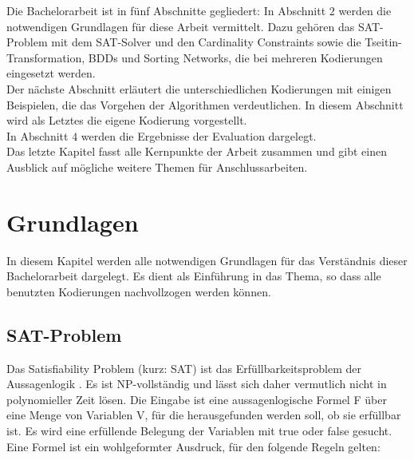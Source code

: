\documentclass[a4,abstract=on]{scrartcl}
\newcommand*\stdsection{}
\let\stdsection\section
\renewcommand*\section{%
    \clearpage\ifodd\value{page}\else\mbox{}\clearpage\fi
    \stdsection}
\begin{document}
Die Bachelorarbeit ist in fünf Abschnitte gegliedert: In Abschnitt $2$ werden die notwendigen Grundlagen für diese Arbeit vermittelt. Dazu gehören das SAT-Problem mit dem SAT-Solver und den Cardinality Constraints sowie die Tseitin-Transformation, BDDs und Sorting Networks, die bei mehreren Kodierungen eingesetzt werden.\\
Der nächste Abschnitt erläutert die unterschiedlichen Kodierungen mit einigen Beispielen, die das Vorgehen der Algorithmen verdeutlichen. In diesem Abschnitt wird als Letztes die eigene Kodierung vorgestellt.\\
In Abschnitt $4$ werden die Ergebnisse der Evaluation dargelegt. \\
Das letzte Kapitel fasst alle Kernpunkte der Arbeit zusammen und gibt einen Ausblick auf mögliche weitere Themen für Anschlussarbeiten.


\section{Grundlagen}
In diesem Kapitel werden alle notwendigen Grundlagen für das Verständnis dieser Bachelorarbeit dargelegt. Es dient als Einführung in das Thema, so dass alle benutzten Kodierungen nachvollzogen werden können.
\subsection{SAT-Problem}
Das Satisfiability Problem (kurz: SAT) ist das Erfüllbarkeitsproblem der Aussagenlogik \cite[vgl.][]{sat-problem}. Es ist NP-vollständig und lässt sich daher vermutlich nicht in polynomieller Zeit lösen. Die Eingabe ist eine aussagenlogische Formel F über eine Menge von Variablen V, für die herausgefunden werden soll, ob sie erfüllbar ist. Es wird eine erfüllende Belegung der Variablen mit true oder false gesucht.\\
Eine Formel ist ein wohlgeformter Ausdruck, für den folgende Regeln gelten:
\end{document}
